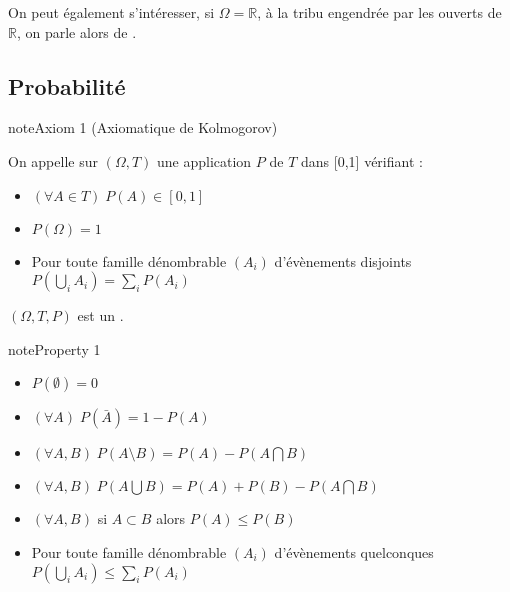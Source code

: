 \documentclass[letterpaper,10pt,french]{sphinxmanual}
\begin{document}
\sphinxAtStartPar
On peut également s’intéresser, si \(\Omega=\mathbb R\), à la tribu engendrée par les ouverts de \(\mathbb{R}\), on parle alors de .


\subsection{Probabilité}
\label{\detokenize{Rappels:probabilite}}
\begin{sphinxShadowBox}

\sphinxAtStartPar
{}
\end{sphinxShadowBox}

\ignorespaces \label{Rappels:axiomKolmo}
\begin{sphinxadmonition}{note}{Axiom 1 (Axiomatique de Kolmogorov)}



\sphinxAtStartPar
On appelle  sur \((\Omega,T)\) une application \(P\) de \(T\) dans {[}0,1{]} vérifiant :
\begin{itemize}
\item {} 
\sphinxAtStartPar
\((\forall A\in T)\; P(A)\in[0,1]\)

\item {} 
\sphinxAtStartPar
\(P(\Omega)=1\)

\item {} 
\sphinxAtStartPar
Pour toute famille dénombrable \((A_i)\) d’évènements disjoints \(P(\displaystyle\bigcup_i A_i) = \displaystyle\sum_iP(A_i)\)

\end{itemize}
\end{sphinxadmonition}

\sphinxAtStartPar
\((\Omega,T,P)\) est un .
\label{Rappels:property-10}
\begin{sphinxadmonition}{note}{Property 1}


\begin{itemize}
\item {} 
\sphinxAtStartPar
\(P(\emptyset)=0\)

\item {} 
\sphinxAtStartPar
\((\forall A)\; P(\bar A)=1-P(A)\)

\item {} 
\sphinxAtStartPar
\((\forall A,B)\; P(A\setminus B) = P(A)-P(A\bigcap B)\)

\item {} 
\sphinxAtStartPar
\((\forall A,B)\; P(A\bigcup B) = P(A)+P(B)-P(A\bigcap B)\)

\item {} 
\sphinxAtStartPar
\((\forall A,B)\) si \(A\subset B\) alors \(P(A)\leq P(B)\)

\item {} 
\sphinxAtStartPar
Pour toute famille dénombrable \((A_i)\) d’évènements quelconques \(P(\displaystyle\bigcup_i A_i) \leq \displaystyle\sum_iP(A_i)\)

\end{itemize}
\end{sphinxadmonition}
\end{document}
